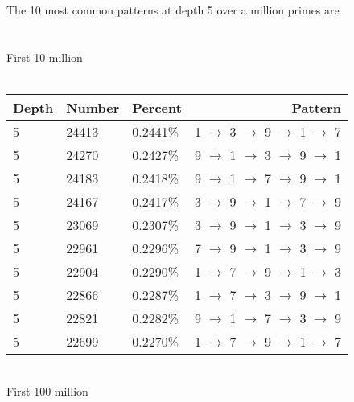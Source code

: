 \documentclass[13pt]{article}
\begin{document}
\\\\The 10 most common patterns at depth 5 over a million primes are\\\\
\\First 10 million\\\\
\begin{tabular}{ l l l r }
  Depth & Number & Percent & Pattern \\
  \hline
    5 & 24413 & 0.2441\% & 1 $\rightarrow$ 3 $\rightarrow$ 9 $\rightarrow$ 1 $\rightarrow$ 7\\
    5 & 24270 & 0.2427\% & 9 $\rightarrow$ 1 $\rightarrow$ 3 $\rightarrow$ 9 $\rightarrow$ 1\\
    5 & 24183 & 0.2418\% & 9 $\rightarrow$ 1 $\rightarrow$ 7 $\rightarrow$ 9 $\rightarrow$ 1\\
    5 & 24167 & 0.2417\% & 3 $\rightarrow$ 9 $\rightarrow$ 1 $\rightarrow$ 7 $\rightarrow$ 9\\
    5 & 23069 & 0.2307\% & 3 $\rightarrow$ 9 $\rightarrow$ 1 $\rightarrow$ 3 $\rightarrow$ 9\\
    5 & 22961 & 0.2296\% & 7 $\rightarrow$ 9 $\rightarrow$ 1 $\rightarrow$ 3 $\rightarrow$ 9\\
    5 & 22904 & 0.2290\% & 1 $\rightarrow$ 7 $\rightarrow$ 9 $\rightarrow$ 1 $\rightarrow$ 3\\
    5 & 22866 & 0.2287\% & 1 $\rightarrow$ 7 $\rightarrow$ 3 $\rightarrow$ 9 $\rightarrow$ 1\\
    5 & 22821 & 0.2282\% & 9 $\rightarrow$ 1 $\rightarrow$ 7 $\rightarrow$ 3 $\rightarrow$ 9\\
    5 & 22699 & 0.2270\% & 1 $\rightarrow$ 7 $\rightarrow$ 9 $\rightarrow$ 1 $\rightarrow$ 7\\
  \end{tabular}
\\First 100 million\\\\
\end{document}
